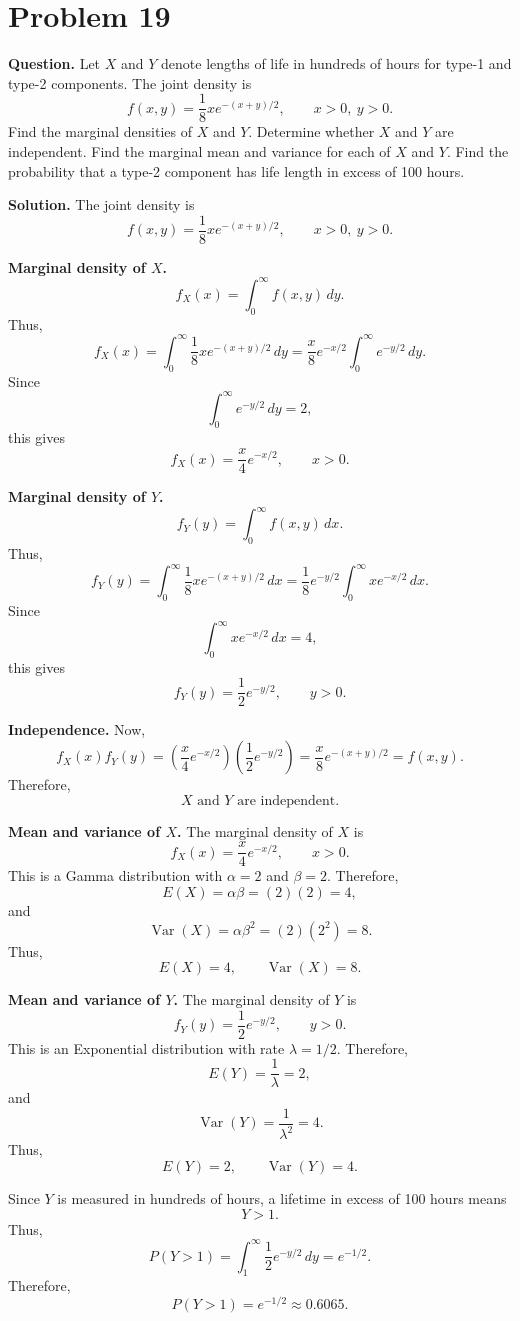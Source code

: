 \documentclass[11pt]{article}
\begin{document}
\newpage
\section*{Problem 19}

\textbf{Question.} Let $X$ and $Y$ denote lengths of life in hundreds of hours for type-1 and type-2 components. The joint density is
\[
f(x,y)=\frac{1}{8}xe^{-(x+y)/2}, \qquad x>0,\ y>0.
\]
Find the marginal densities of $X$ and $Y$. Determine whether $X$ and $Y$ are independent. Find the marginal mean and variance for each of $X$ and $Y$. Find the probability that a type-2 component has life length in excess of 100 hours.

\textbf{Solution.} The joint density is
\[
f(x,y)=\frac{1}{8}xe^{-(x+y)/2}, \qquad x>0,\ y>0.
\]

\textbf{Marginal density of $X$.}
\[
f_X(x)=\int_0^\infty f(x,y)\,dy.
\]
Thus,
\[
f_X(x)=\int_0^\infty \frac{1}{8}xe^{-(x+y)/2}\,dy
=\frac{x}{8}e^{-x/2}\int_0^\infty e^{-y/2}\,dy.
\]
Since
\[
\int_0^\infty e^{-y/2}\,dy=2,
\]
this gives
\[
\boxed{f_X(x)=\frac{x}{4}e^{-x/2}, \qquad x>0.}
\]

\textbf{Marginal density of $Y$.}
\[
f_Y(y)=\int_0^\infty f(x,y)\,dx.
\]
Thus,
\[
f_Y(y)=\int_0^\infty \frac{1}{8}xe^{-(x+y)/2}\,dx
=\frac{1}{8}e^{-y/2}\int_0^\infty xe^{-x/2}\,dx.
\]
Since
\[
\int_0^\infty xe^{-x/2}\,dx=4,
\]
this gives
\[
\boxed{f_Y(y)=\frac{1}{2}e^{-y/2}, \qquad y>0.}
\]

\textbf{Independence.} Now,
\[
f_X(x)f_Y(y)=\left(\frac{x}{4}e^{-x/2}\right)\left(\frac{1}{2}e^{-y/2}\right)=\frac{x}{8}e^{-(x+y)/2}=f(x,y).
\]
Therefore,
\[
\boxed{X\text{ and }Y\text{ are independent}.}
\]

\textbf{Mean and variance of $X$.} The marginal density of $X$ is
\[
f_X(x)=\frac{x}{4}e^{-x/2}, \qquad x>0.
\]
This is a Gamma distribution with $\alpha=2$ and $\beta=2$. Therefore,
\[
E(X)=\alpha\beta=(2)(2)=4,
\]
and
\[
\operatorname{Var}(X)=\alpha\beta^2=(2)(2^2)=8.
\]
Thus,
\[
\boxed{E(X)=4, \qquad \operatorname{Var}(X)=8}.
\]

\textbf{Mean and variance of $Y$.} The marginal density of $Y$ is
\[
f_Y(y)=\frac{1}{2}e^{-y/2}, \qquad y>0.
\]
This is an Exponential distribution with rate $\lambda=1/2$. Therefore,
\[
E(Y)=\frac{1}{\lambda}=2,
\]
and
\[
\operatorname{Var}(Y)=\frac{1}{\lambda^2}=4.
\]
Thus,
\[
\boxed{E(Y)=2, \qquad \operatorname{Var}(Y)=4}.
\]

Since $Y$ is measured in hundreds of hours, a lifetime in excess of 100 hours means
\[
Y>1.
\]
Thus,
\[
P(Y>1)=\int_1^\infty \frac{1}{2}e^{-y/2}\,dy=e^{-1/2}.
\]
Therefore,
\[
\boxed{P(Y>1)=e^{-1/2}\approx 0.6065}.
\]
\end{document}
